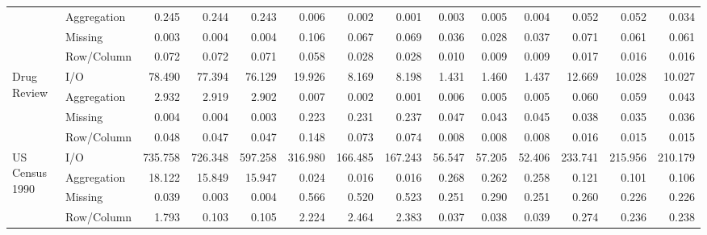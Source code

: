 \begin{tabular}{llrrrrrrrrrrrr}
 & Aggregation & 0.245 & 0.244 & 0.243 & 0.006 & 0.002 & 0.001 & 0.003 & 0.005 & 0.004 & 0.052 & 0.052 & 0.034 \\
 & Missing & 0.003 & 0.004 & 0.004 & 0.106 & 0.067 & 0.069 & 0.036 & 0.028 & 0.037 & 0.071 & 0.061 & 0.061 \\
 & Row/Column & 0.072 & 0.072 & 0.071 & 0.058 & 0.028 & 0.028 & 0.010 & 0.009 & 0.009 & 0.017 & 0.016 & 0.016 \\
\cline{1-14}
\multirow[t]{4}{*}{Drug Review} & I/O & 78.490 & 77.394 & 76.129 & 19.926 & 8.169 & 8.198 & 1.431 & 1.460 & 1.437 & 12.669 & 10.028 & 10.027 \\
 & Aggregation & 2.932 & 2.919 & 2.902 & 0.007 & 0.002 & 0.001 & 0.006 & 0.005 & 0.005 & 0.060 & 0.059 & 0.043 \\
 & Missing & 0.004 & 0.004 & 0.003 & 0.223 & 0.231 & 0.237 & 0.047 & 0.043 & 0.045 & 0.038 & 0.035 & 0.036 \\
 & Row/Column & 0.048 & 0.047 & 0.047 & 0.148 & 0.073 & 0.074 & 0.008 & 0.008 & 0.008 & 0.016 & 0.015 & 0.015 \\
\cline{1-14}
\multirow[t]{4}{*}{US Census 1990} & I/O & 735.758 & 726.348 & 597.258 & 316.980 & 166.485 & 167.243 & 56.547 & 57.205 & 52.406 & 233.741 & 215.956 & 210.179 \\
 & Aggregation & 18.122 & 15.849 & 15.947 & 0.024 & 0.016 & 0.016 & 0.268 & 0.262 & 0.258 & 0.121 & 0.101 & 0.106 \\
 & Missing & 0.039 & 0.003 & 0.004 & 0.566 & 0.520 & 0.523 & 0.251 & 0.290 & 0.251 & 0.260 & 0.226 & 0.226 \\
 & Row/Column & 1.793 & 0.103 & 0.105 & 2.224 & 2.464 & 2.383 & 0.037 & 0.038 & 0.039 & 0.274 & 0.236 & 0.238 \\
\cline{1-14}
\bottomrule
\end{tabular}
